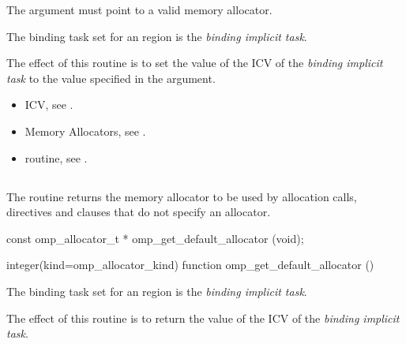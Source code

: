 \constraints

The  argument must point to a valid memory allocator.

\binding
The binding task set for an  region is the \emph{binding implicit task}.

\effect

The effect of this routine is to set the value of the  ICV of the \emph{binding implicit task} to the value specified in the  argument. 

\crossreferences

\begin{itemize}
\item {} ICV, see .
\item Memory Allocators, see .
\item {} routine, see .
\end{itemize}

\subsection{}
\label{subsec:omp_get_default_allocator}

\summary
The  routine returns the memory allocator to be used by allocation calls,  directives and  clauses that do not specify an allocator.

\format
\ccppspecificstart
\begin{boxedcode}
const omp_allocator_t * omp_get_default_allocator (void);
\end{boxedcode}
\ccppspecificend
\fortranspecificstart
\begin{boxedcode}
integer(kind=omp_allocator_kind) 
function omp_get_default_allocator ()
\end{boxedcode}
\fortranspecificend

\binding

The binding task set for an  region is the \emph{binding implicit task}.

\effect

The effect of this routine is to return the value of the  ICV of the \emph{binding implicit task}.

